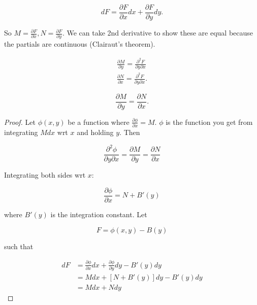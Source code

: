 \begin{equation}
    dF=\frac{\partial F}{\partial x}dx+\frac{\partial F}{\partial y}dy.
\end{equation}

So $M=\frac{\partial F}{\partial x},N=\frac{\partial F}{\partial y}$. We can take 2nd derivative to show these are equal because the partials are continuous (Clairaut's theorem).

\begin{eqnarray}
    \frac{\partial M}{\partial y}=\frac{\partial^2 F}{\partial y\partial x}\\
    \frac{\partial N}{\partial x}=\frac{\partial^2 F}{\partial y\partial x}.
\end{eqnarray}

\begin{definition}[Exactness]
    \begin{equation}
        \frac{\partial M}{\partial y}=\frac{\partial N}{\partial x}.
    \end{equation}
\end{definition}

\begin{proof}
    Let $\phi(x,y)$ be a function where $\frac{\partial \phi}{\partial x}=M$. $\phi$ is the function you get from integrating $Mdx$ wrt $x$ and holding $y$. Then

    \begin{equation}
        \frac{\partial^2\phi}{\partial y\partial x}=\frac{\partial M}{\partial y}=\frac{\partial N}{\partial x}
    \end{equation}

    Integrating both sides wrt $x$:

    \begin{equation}
        \frac{\partial \phi}{\partial x}=N+B'(y)
    \end{equation}

    where $B'(y)$ is the integration constant. Let

    \begin{equation}
        F=\phi(x,y)-B(y)
    \end{equation}

    such that 

    \begin{align}
        dF&=\frac{\partial \phi}{\partial x}dx+\frac{\partial \phi}{\partial y}dy-B'(y)dy\\
        &=Mdx+\left[N+B'(y)\right]dy-B'(y)dy\\
        &=Mdx+Ndy
    \end{align}
\end{proof}


